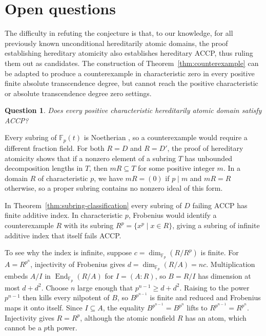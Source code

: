 \documentclass{article}
\newtheorem{question}[proposition]{Question}
\theoremstyle{remark}
\begin{document}
\section{Open questions}

The difficulty in refuting the conjecture is that, to our knowledge, for all previously known unconditional hereditarily atomic domains, the proof establishing hereditary atomicity also establishes hereditary ACCP, thus ruling them out as candidates.
The construction of Theorem~\ref{thm:counterexample} can be adapted to produce a counterexample in characteristic zero in every positive finite absolute transcendence degree, but cannot reach the positive characteristic or absolute transcendence degree zero settings.

\begin{question}
    Does every positive characteristic hereditarily atomic domain satisfy ACCP?
\end{question}

Every subring of $\mathbb{F}_p(t)$ is Noetherian \cite[Theorem~4]{Gilmer}, so a counterexample would require a different fraction field.
For both $R = D$ and $R = D'$, the proof of hereditary atomicity shows that if a nonzero element of a subring $T$ has unbounded decomposition lengths in $T$, then $mR \subseteq T$ for some positive integer $m$.
In a domain $R$ of characteristic $p$, we have $mR = (0)$ if $p \mid m$ and $mR = R$ otherwise, so a proper subring contains no nonzero ideal of this form.

In Theorem~\ref{thm:subring-classification} every subring of $D$ failing ACCP has finite additive index.
In characteristic $p$, Frobenius would identify a counterexample $R$ with its subring $R^p = \{x^p \mid x \in R\}$, giving a subring of infinite additive index that itself fails ACCP.

To see why the index is infinite, suppose $c = \dim_{\mathbb{F}_p}(R/R^p)$ is finite.
For $A = R^{p^n}$, injectivity of Frobenius gives $d = \dim_{\mathbb{F}_p}(R/A) = nc$.
Multiplication embeds $A/I$ in $\operatorname{End}_{\mathbb{F}_p}(R/A)$ for $I = (A : R)$, so $B = R/I$ has dimension at most $d + d^2$.
Choose $n$ large enough that $p^{n - 1} \ge d + d^2$.
Raising to the power $p^{n - 1}$ then kills every nilpotent of $B$, so $B^{p^{n - 1}}$ is finite and reduced and Frobenius maps it onto itself.
Since $I \subseteq A$, the equality $B^{p^{n - 1}} = B^{p^n}$ lifts to $R^{p^{n - 1}} = R^{p^n}$.
Injectivity gives $R = R^p$, although the atomic nonfield $R$ has an atom, which cannot be a $p$th power.
\end{document}

